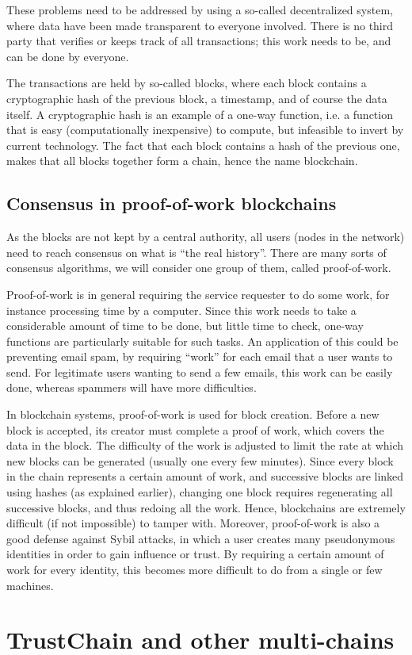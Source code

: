 These problems need to be addressed by using a so-called decentralized system, where data have been made transparent to everyone involved. There is no third party that verifies or keeps track of all transactions; this work needs to be, and can be done by everyone. 

The transactions are held by so-called blocks, where each block contains a cryptographic hash of the previous block, a timestamp, and of course the data itself. A cryptographic hash is an example of a one-way function, i.e. a function that is easy (computationally inexpensive) to compute, but infeasible to invert by current technology. The fact that each block contains a hash of the previous one, makes that all blocks together form a chain, hence the name blockchain. 

\subsection{Consensus in proof-of-work blockchains}
As the blocks are not kept by a central authority, all users (nodes in the network) need to reach consensus on what is ``the real history''. There are many sorts of consensus algorithms, we will consider one group of them, called proof-of-work. 

Proof-of-work is in general requiring the service requester to do some work, for instance processing time by a computer. Since this work needs to take a considerable amount of time to be done, but little time to check, one-way functions are particularly suitable for such tasks. An application of this could be preventing email spam, by requiring ``work'' for each email that a user wants to send. For legitimate users wanting to send a few emails, this work can be easily done, whereas spammers will have more difficulties. 

In blockchain systems, proof-of-work is used for block creation. Before a new block is accepted, its creator must complete a proof of work, which covers the data in the block. The difficulty of the work is adjusted to limit the rate at which new blocks can be generated (usually one every few minutes). Since every block in the chain represents a certain amount of work, and successive blocks are linked using hashes (as explained earlier), changing one block requires regenerating all successive blocks, and thus redoing all the work. Hence, blockchains are extremely difficult (if not impossible) to tamper with. Moreover, proof-of-work is also a good defense against Sybil attacks, in which a user creates many pseudonymous identities in order to gain influence or trust. By requiring a certain amount of work for every identity, this becomes more difficult to do from a single or few machines. 

\section{TrustChain and other multi-chains}
